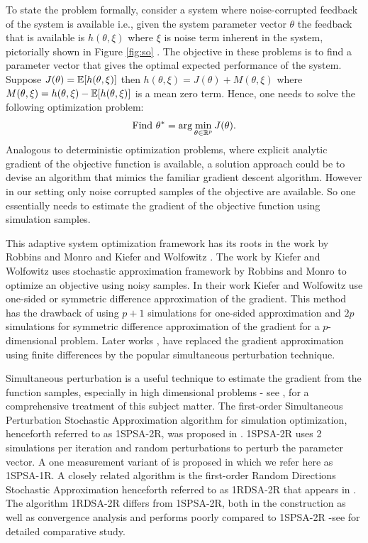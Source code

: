 \documentclass[letterpaper, 10 pt, conference]{ieeeconf}  %
\begin{document}
To state the problem formally, consider a system where noise-corrupted feedback of the 
system is available i.e., given the system parameter vector $\theta$ the feedback that is 
available is $h(\theta, \xi)$ where $\xi$ is noise term inherent in the system, 
pictorially shown in Figure \ref{fig:so} . The objective in these problems is to find a 
parameter vector that gives the optimal expected performance of the system. 
Suppose $J(\theta)=\mathbb{E}[h(\theta, \xi)]$ then $h(\theta, \xi)=J(\theta)+M(\theta,\xi)$ 
where $M(\theta,\xi)=h(\theta, \xi)-\mathbb{E}[h(\theta, \xi)]$ is a mean zero term. Hence, one 
needs to solve the following optimization problem:
\begin{align}
\mbox{Find } \theta^* = \arg\min_{\theta \in \mathbb{R}^p} J(\theta). \label{eq:pb}
\end{align}
Analogous to deterministic optimization problems, where explicit analytic gradient of the 
objective function is available, a solution approach could be to devise an algorithm that 
mimics the familiar gradient descent algorithm. However in our setting only noise corrupted 
samples of the objective are available. So one essentially needs to estimate the gradient 
of the objective function using simulation samples.

This adaptive system optimization framework has its roots in the work by 
Robbins and Monro \cite{robbins1951} and Kiefer and Wolfowitz \cite{kiefer1952}. 
The work by Kiefer and Wolfowitz uses stochastic approximation framework by 
Robbins and Monro to optimize an objective using noisy samples. In their work
Kiefer and Wolfowitz \cite{kiefer1952} use 
one-sided or symmetric difference approximation of the gradient. 
This method has the drawback of using $p+1$ simulations for one-sided approximation and
$2p$ simulations for symmetric difference approximation of the gradient for a 
$p$-dimensional problem. Later works \cite{kushcla},\cite{spall} have replaced the 
gradient approximation using finite differences by the popular 
simultaneous perturbation technique.

Simultaneous perturbation is a useful technique to estimate the gradient from the function 
samples, especially in high dimensional problems - see \cite{bhatnagar-book},
\cite{spallbook} for a comprehensive treatment of this subject matter.
The first-order Simultaneous Perturbation Stochastic Approximation algorithm for 
simulation optimization, henceforth referred to as 1SPSA-2R, was 
proposed in \cite{spall}. 1SPSA-2R uses 2 simulations per iteration and random 
perturbations to perturb the parameter vector. 
A one measurement variant of \cite{spall} is proposed in \cite{spall2} which we refer here
as 1SPSA-1R.
A closely related algorithm is the first-order Random Directions 
Stochastic Approximation henceforth referred to as 1RDSA-2R that appears in
\cite[pp.~58-60]{kushcla}.
The algorithm 1RDSA-2R differs from 1SPSA-2R, both in the construction as well as 
convergence analysis and performs poorly compared to 1SPSA-2R -see 
\cite{chin1997comparative} for detailed comparative study. 
\end{document}
